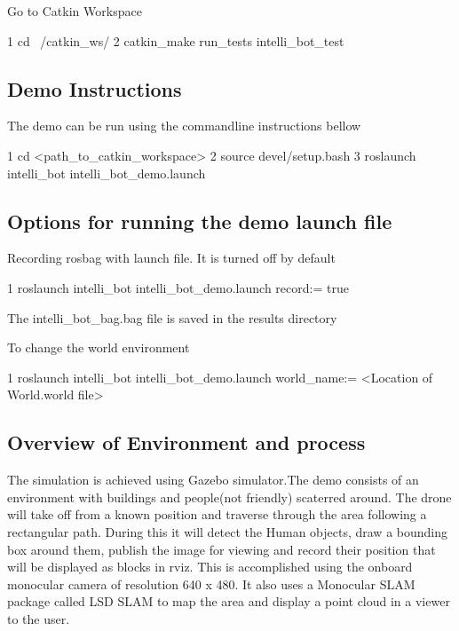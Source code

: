 Go to Catkin Workspace 
\begin{DoxyCode}
1 cd ~/catkin\_ws/
2 catkin\_make run\_tests intelli\_bot\_test
\end{DoxyCode}


\subsection*{Demo Instructions}

The demo can be run using the commandline instructions bellow 
\begin{DoxyCode}
1 cd <path\_to\_catkin\_workspace>
2 source devel/setup.bash
3 roslaunch intelli\_bot intelli\_bot\_demo.launch
\end{DoxyCode}


\subsection*{Options for running the demo launch file}


\begin{DoxyItemize}
\item Recording rosbag with launch file. It is turned off by default 
\begin{DoxyCode}
1 roslaunch intelli\_bot intelli\_bot\_demo.launch record:= true
\end{DoxyCode}
 The intelli\+\_\+bot\+\_\+bag.\+bag file is saved in the results directory
\item To change the world environment 
\begin{DoxyCode}
1 roslaunch intelli\_bot intelli\_bot\_demo.launch world\_name:= <Location of World.world file>
\end{DoxyCode}

\end{DoxyItemize}

\subsection*{Overview of Environment and process}

The simulation is achieved using Gazebo simulator.\+The demo consists of an environment with buildings and people(not friendly) scaterred around. The drone will take off from a known position and traverse through the area following a rectangular path. During this it will detect the Human objects, draw a bounding box around them, publish the image for viewing and record their position that will be displayed as blocks in rviz. This is accomplished using the onboard monocular camera of resolution 640 x 480. It also uses a Monocular S\+L\+AM package called L\+SD S\+L\+AM to map the area and display a point cloud in a viewer to the user.

